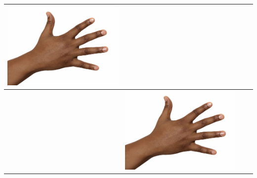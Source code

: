 \begin{longtable}{|N||c|c|c|}
\begin{minipage}{.29\textwidth}
      \includegraphics[width=\textwidth,height=\textheight,keepaspectratio]{images/test/hand_dark}
    \end{minipage} \\
  \hline
    \label{row:results_xx_2} &
    \begin{minipage}{.29\textwidth}
      \includegraphics[width=\textwidth,height=\textheight,keepaspectratio]{images/test/hand_dark}
    \end{minipage} & 
    \begin{minipage}{.29\textwidth}

\end{minipage}
\end{longtable}
